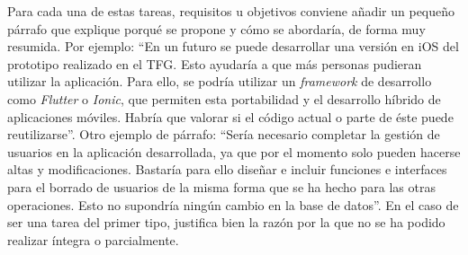  Para cada una de estas tareas, requisitos u objetivos conviene añadir un pequeño párrafo que explique porqué se propone y cómo se abordaría, de forma muy resumida. Por ejemplo: ``En un futuro se puede desarrollar una versión en iOS del prototipo realizado en el TFG. Esto ayudaría a que más personas pudieran utilizar la aplicación. Para ello, se podría utilizar un \textit{framework} de desarrollo como \textit{Flutter} o \textit{Ionic}, que permiten esta portabilidad y el desarrollo híbrido de aplicaciones móviles. Habría que valorar si el código actual o parte de éste puede reutilizarse''. Otro ejemplo de párrafo: ``Sería necesario completar la gestión de usuarios en la aplicación desarrollada, ya que por el momento solo pueden hacerse altas y modificaciones. Bastaría para ello diseñar e incluir funciones e interfaces para el borrado de usuarios de la misma forma que se ha hecho para las otras operaciones. Esto no supondría ningún cambio en la base de datos''.  En el caso de ser una tarea del primer tipo, justifica bien la razón por la que no se ha podido realizar íntegra o parcialmente. 

 

 